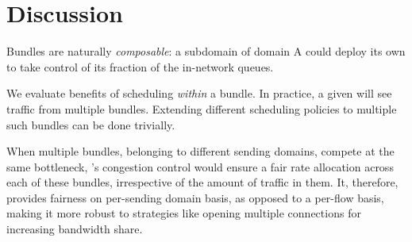 \section{Discussion}\label{s:discussion}

 Bundles are naturally \emph{composable}: a subdomain of domain A could deploy its own \name to take control of its fraction of the in-network queues. 

 We evaluate benefits of scheduling \emph{within} a bundle. In practice, a given \inbox will see traffic from multiple bundles. Extending different scheduling policies to multiple such bundles can be done trivially.

 When multiple bundles, belonging to different sending domains, compete at the same bottleneck, \name's congestion control would ensure a fair rate allocation across each of these bundles, irrespective of the amount of traffic in them. It, therefore, provides fairness on per-sending domain basis, as opposed to a per-flow basis, making it more robust to strategies like opening multiple connections for increasing bandwidth share. 







